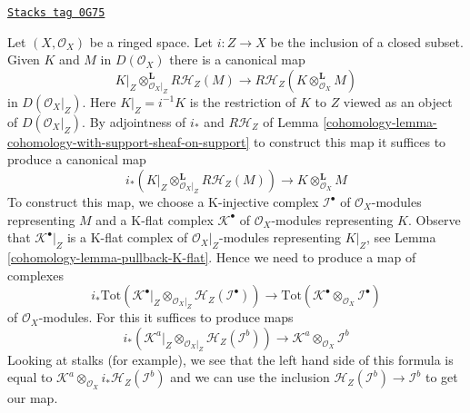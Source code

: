 \begin{remark}
\label{cohomology-remark-support-cup-product}
\href{https://stacks.math.columbia.edu/tag/0G75}{\texttt{Stacks tag 0G75}}

Let $(X, \mathcal{O}_X)$ be a ringed space. Let $i : Z \to X$
be the inclusion of a closed subset. Given $K$ and $M$ in
$D(\mathcal{O}_X)$ there is a canonical map
$$
K|_Z \otimes_{\mathcal{O}_X|_Z}^\mathbf{L} R\mathcal{H}_Z(M)
\longrightarrow
R\mathcal{H}_Z(K \otimes_{\mathcal{O}_X}^\mathbf{L} M)
$$
in $D(\mathcal{O}_X|_Z)$. Here $K|_Z = i^{-1}K$ is the restriction of
$K$ to $Z$ viewed as an object of $D(\mathcal{O}_X|_Z)$. By adjointness
of $i_*$ and $R\mathcal{H}_Z$ of
Lemma \ref{cohomology-lemma-cohomology-with-support-sheaf-on-support} to construct this
map it suffices to produce a canonical map
$$
i_*\left(K|_Z \otimes_{\mathcal{O}_X|_Z}^\mathbf{L} R\mathcal{H}_Z(M)\right)
\longrightarrow
K \otimes_{\mathcal{O}_X}^\mathbf{L} M
$$
To construct this map, we choose a K-injective complex $\mathcal{I}^\bullet$
of $\mathcal{O}_X$-modules representing $M$ and a K-flat complex
$\mathcal{K}^\bullet$ of $\mathcal{O}_X$-modules representing $K$.
Observe that $\mathcal{K}^\bullet|_Z$ is a K-flat complex of
$\mathcal{O}_X|_Z$-modules representing $K|_Z$, see
Lemma \ref{cohomology-lemma-pullback-K-flat}. Hence we need to produce a map
of complexes
$$
i_*\text{Tot}\left(
\mathcal{K}^\bullet|_Z \otimes_{\mathcal{O}_X|_Z}
\mathcal{H}_Z(\mathcal{I}^\bullet)\right)
\longrightarrow
\text{Tot}(\mathcal{K}^\bullet \otimes_{\mathcal{O}_X} \mathcal{I}^\bullet)
$$
of $\mathcal{O}_X$-modules. For this it suffices to produce maps
$$
i_*(\mathcal{K}^a|_Z \otimes_{\mathcal{O}_X|_Z}
\mathcal{H}_Z(\mathcal{I}^b))
\longrightarrow
\mathcal{K}^a \otimes_{\mathcal{O}_X} \mathcal{I}^b
$$
Looking at stalks (for example), we see that the left hand side of this
formula is equal to
$\mathcal{K}^a \otimes_{\mathcal{O}_X} i_*\mathcal{H}_Z(\mathcal{I}^b)$
and we can use the inclusion
$\mathcal{H}_Z(\mathcal{I}^b) \to \mathcal{I}^b$ to get our map.
\end{remark}

